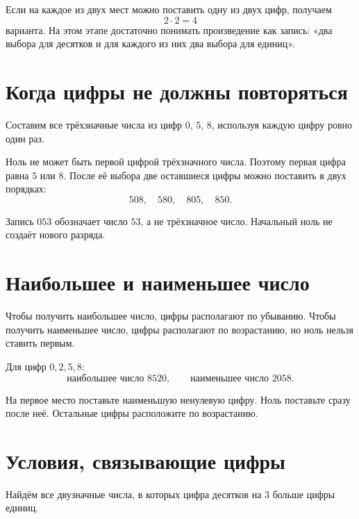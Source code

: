 Если на каждое из двух мест можно поставить одну из двух цифр, получаем
\[
  2\cdot2=4
\]
варианта. На этом этапе достаточно понимать произведение как запись:
«два выбора для десятков и для каждого из них два выбора для единиц».

\section{Когда цифры не должны повторяться}

Составим все трёхзначные числа из цифр \(0\), \(5\), \(8\), используя
каждую цифру ровно один раз.

\norepeattreefigure

Ноль не может быть первой цифрой трёхзначного числа. Поэтому первая цифра
равна \(5\) или \(8\). После её выбора две оставшиеся цифры можно поставить
в двух порядках:
\[
  \boxed{508},\quad \boxed{580},\quad \boxed{805},\quad \boxed{850}.
\]

\begin{warningbox}
  Запись \(053\) обозначает число \(53\), а не трёхзначное число. Начальный
  ноль не создаёт нового разряда.
\end{warningbox}

\section{Наибольшее и наименьшее число}

Чтобы получить наибольшее число, цифры располагают по убыванию.
Чтобы получить наименьшее число, цифры располагают по возрастанию, но ноль
нельзя ставить первым.

\largestsmallestfigure

Для цифр \(0,2,5,8\):
\[
  \text{наибольшее число }8520,
  \qquad
  \text{наименьшее число }2058.
\]

\begin{propertybox}
  На первое место поставьте наименьшую ненулевую цифру. Ноль поставьте сразу
  после неё. Остальные цифры расположите по возрастанию.
\end{propertybox}

\section{Условия, связывающие цифры}

Найдём все двузначные числа, в которых цифра десятков на \(3\) больше цифры
единиц.

